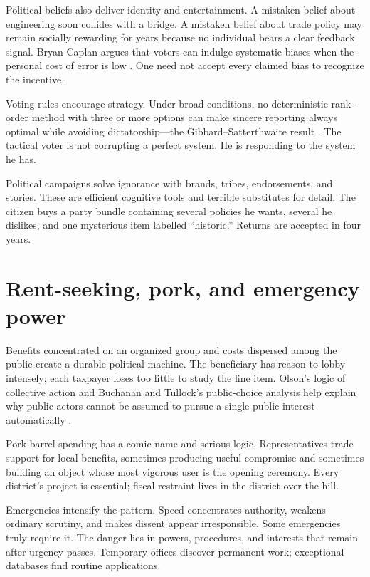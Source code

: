 \documentclass[12pt,a4paper]{book}
\begin{document}
Political beliefs also deliver identity and entertainment.  A mistaken belief
about engineering soon collides with a bridge.  A mistaken belief about trade
policy may remain socially rewarding for years because no individual bears a
clear feedback signal.  Bryan Caplan argues that voters can indulge systematic
biases when the personal cost of error is low \cite{Caplan2007}.  One need not
accept every claimed bias to recognize the incentive.

Voting rules encourage strategy.  Under broad conditions, no deterministic
rank-order method with three or more options can make sincere reporting always
optimal while avoiding dictatorship---the Gibbard--Satterthwaite result
\cite{Gibbard1973,Satterthwaite1975}.  The tactical voter is not corrupting a
perfect system.  He is responding to the system he has.

Political campaigns solve ignorance with brands, tribes, endorsements, and
stories.  These are efficient cognitive tools and terrible substitutes for
detail.  The citizen buys a party bundle containing several policies he wants,
several he dislikes, and one mysterious item labelled ``historic.''  Returns
are accepted in four years.

\section{Rent-seeking, pork, and emergency power}

Benefits concentrated on an organized group and costs dispersed among the
public create a durable political machine.  The beneficiary has reason to
lobby intensely; each taxpayer loses too little to study the line item.  Olson's
logic of collective action and Buchanan and Tullock's public-choice analysis
help explain why public actors cannot be assumed to pursue a single public
interest automatically \cite{Olson1965,BuchananTullock1962}.

Pork-barrel spending has a comic name and serious logic.  Representatives trade
support for local benefits, sometimes producing useful compromise and sometimes
building an object whose most vigorous user is the opening ceremony.  Every
district's project is essential; fiscal restraint lives in the district over
the hill.

Emergencies intensify the pattern.  Speed concentrates authority, weakens
ordinary scrutiny, and makes dissent appear irresponsible.  Some emergencies
truly require it.  The danger lies in powers, procedures, and interests that
remain after urgency passes.  Temporary offices discover permanent work;
exceptional databases find routine applications.
\end{document}
